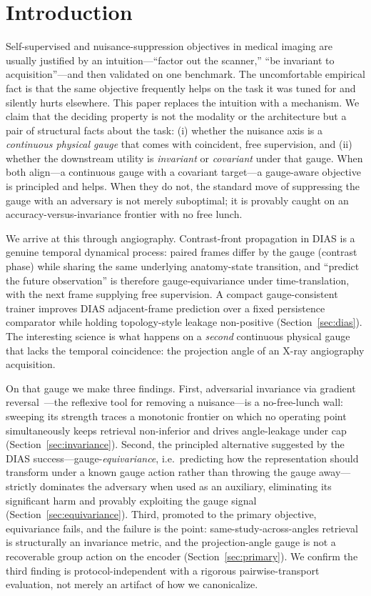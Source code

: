 \documentclass[11pt]{article}
\begin{document}
\section{Introduction}

Self-supervised and nuisance-suppression objectives in medical imaging are usually justified by an
intuition---``factor out the scanner,'' ``be invariant to acquisition''---and then validated on one
benchmark. The uncomfortable empirical fact is that the same objective frequently helps on the task
it was tuned for and silently hurts elsewhere. This paper replaces the intuition with a mechanism.
We claim that the deciding property is not the modality or the architecture but a pair of
structural facts about the task: (i) whether the nuisance axis is a \emph{continuous physical
gauge} that comes with coincident, free supervision, and (ii) whether the downstream utility is
\emph{invariant} or \emph{covariant} under that gauge. When both align---a continuous gauge with a
covariant target---a gauge-aware objective is principled and helps. When they do not, the standard
move of suppressing the gauge with an adversary is not merely suboptimal; it is provably caught on
an accuracy-versus-invariance frontier with no free lunch.

We arrive at this through angiography. Contrast-front propagation in DIAS is a genuine temporal
dynamical process: paired frames differ by the gauge (contrast phase) while sharing the same
underlying anatomy-state transition, and ``predict the future observation'' is therefore
gauge-equivariance under time-translation, with the next frame supplying free supervision. A
compact gauge-consistent trainer improves DIAS adjacent-frame prediction over a fixed persistence
comparator while holding topology-style leakage non-positive (Section~\ref{sec:dias}). The
interesting science is what happens on a \emph{second} continuous physical gauge that lacks the
temporal coincidence: the projection angle of an X-ray angiography acquisition.

On that gauge we make three findings. First, adversarial invariance via gradient
reversal~\citep{ganin2016domainadversarial}---the reflexive tool for removing a nuisance---is a
no-free-lunch wall: sweeping its strength traces a monotonic frontier on which no operating point
simultaneously keeps retrieval non-inferior and drives angle-leakage under cap
(Section~\ref{sec:invariance}). Second, the principled alternative suggested by the DIAS
success---gauge-\emph{equivariance}, i.e.\ predicting how the representation should transform under a
known gauge action rather than throwing the gauge away---strictly dominates the adversary when used
as an auxiliary, eliminating its significant harm and provably exploiting the gauge signal
(Section~\ref{sec:equivariance}). Third, promoted to the primary objective, equivariance fails, and
the failure is the point: same-study-across-angles retrieval is structurally an invariance metric,
and the projection-angle gauge is not a recoverable group action on the encoder
(Section~\ref{sec:primary}). We confirm the third finding is protocol-independent with a rigorous
pairwise-transport evaluation, not merely an artifact of how we canonicalize.
\end{document}
